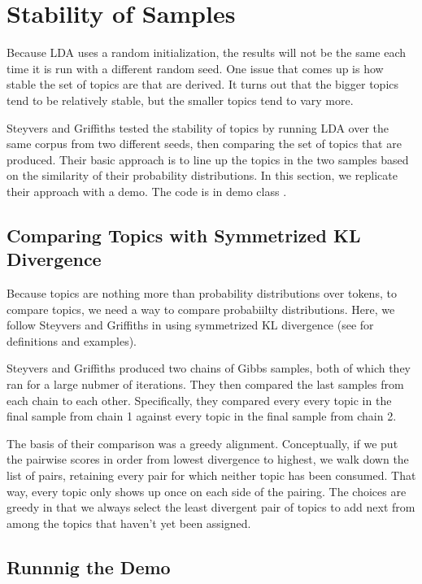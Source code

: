 \section{Stability of Samples}

Because LDA uses a random initialization, the results will not be the
same each time it is run with a different random seed.  One issue
that comes up is how stable the set of topics are that are derived.
It turns out that the bigger topics tend to be relatively stable,
but the smaller topics tend to vary more.  

Steyvers and Griffiths tested the stability of topics by running LDA
over the same corpus from two different seeds, then comparing the set
of topics that are produced.  Their basic approach is to line up
the topics in the two samples based on the similarity of their
probability distributions.   In this section, we replicate their
approach with a demo.  The code is in demo class .

\subsection{Comparing Topics with Symmetrized KL Divergence}

Because topics are nothing more than probability distributions over
tokens, to compare topics, we need a way to compare probabiilty
distributions.  Here, we follow Steyvers and Griffiths in using
symmetrized KL divergence (see
 for definitions and
examples).

Steyvers and Griffiths produced two chains of Gibbs samples, both of
which they ran for a large nubmer of iterations.  They then compared
the last samples from each chain to each other.  Specifically, they
compared every every topic in the final sample from chain 1 against
every topic in the final sample from chain 2.  

The basis of their comparison was a greedy alignment.  Conceptually,
if we put the pairwise scores in order from lowest divergence to
highest, we walk down the list of pairs, retaining every pair for
which neither topic has been consumed.  That way, every topic only
shows up once on each side of the pairing.  The choices are greedy in
that we always select the least divergent pair of topics to add next
from among the topics that haven't yet been assigned.


\subsection{Runnnig the Demo}

